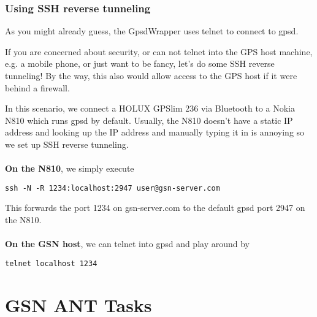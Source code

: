 \subsubsection{Using SSH reverse tunneling}
As you might already guess, the GpsdWrapper uses telnet to connect to gpsd. 

If you are concerned about security, or can not telnet into the GPS host machine, e.g. a mobile phone, or just want to be fancy, let's do some SSH reverse tunneling! By the way, this also would allow access to the GPS host if it were behind a firewall.

In this scenario, we connect a HOLUX GPSlim 236 via Bluetooth to a Nokia N810 which runs gpsd by default. Usually, the N810 doesn't have a static IP address and looking up the IP address and manually typing it in is annoying so we set up SSH reverse tunneling.\\
\\
\textbf{On the N810}, we simply execute 
\begin{verbatim}
ssh -N -R 1234:localhost:2947 user@gsn-server.com
\end{verbatim}
This forwards the port 1234 on gsn-server.com to the default gpsd port 2947 on the N810.\\
\\
\textbf{On the GSN host}, we can telnet into gpsd and play around by
\begin{verbatim}
telnet localhost 1234
\end{verbatim}

\section{GSN ANT Tasks \label{quickref_ant_task}}


